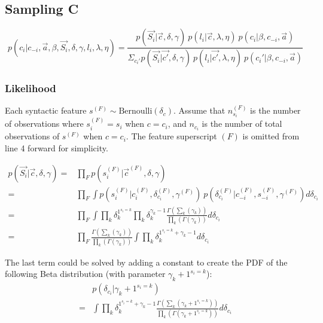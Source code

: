 \subsection{Sampling C}
\begin{equation}
p(c_{i}| c_{-i}, \vec{a}, \beta, \vec{S_{i}}, \delta, \gamma, l_{i}, \lambda, \eta) = \frac{p(\vec{S_{i}}| \vec{c}, \delta, \gamma)\ p(l_{i} |\vec{c},\lambda, \eta)\ p(c_{i}|\beta, c_{-i}, \vec{a})}{\Sigma_{c_{i}'}p(\vec{S_{i}}| \vec{c'}, \delta, \gamma)\ p(l_{i} |\vec{c'},\lambda, \eta)\ p(c_{i}'|\beta, c_{-i}, \vec{a})}
\end{equation}

\subsubsection{Likelihood}
Each syntactic feature $s^{(F)}\sim \mbox{Bernoulli}(\delta_{c})$. Assume that $n^{(F)}_{s_{i}}$ is the number of observations where $s^{(F)}_{i}=s_{i}$ when $c=c_{i}$, and $n_{c_{i}}$ is the number of total observations of $s^{(F)}$ when $c=c_{i}$. The feature superscript $(F)$ is omitted from line 4 forward for simplicity.

\begin{equation}
\begin{split}\label{p(s|c)}
p(\vec{S_{i}}| \vec{c}, \delta, \gamma) = & \prod_{F} p(s^{(F)}_{i}|\vec{c}^{(F)}, \delta, \gamma)\\%
= &\prod_{F}\int p(s^{(F)}_{i}|c_{i}^{(F)}, \delta^{(F)}_{c_{i}}, \gamma^{(F)})\ p(\delta^{(F)}_{c_{i}}|c^{(F)}_{-i}, s^{(F)}_{-i},\gamma^{(F)}) d\delta_{c_{i}}\\%
=& \prod_{F}\int \prod_{k} \delta^{1^{s_{i}=k}}_{k}%
\prod_{k} \delta_{k}^{\gamma_{k}-1}  %
\frac{\Gamma(\sum_{k}(\gamma_{k}))}{\prod_{k}(\Gamma(\gamma_{k}))}%
d\delta_{c_{i}} \\ 
=& \prod_{F} \frac{\Gamma(\sum_{k}(\gamma_{k}))}{\prod_{k}(\Gamma(\gamma_{k}))}%
\int \prod_{k}\delta_{k}^{1^{s_{i}=k}+\gamma_{k}-1}d\delta_{c_{i}} %
\end{split}
\end{equation}

\noindent The last term could be solved by adding a constant to create the PDF of the following Beta distribution (with parameter $\gamma_{k}+1^{s_{i}=k} $):
\begin{equation}
\begin{split}
&p(\delta_{c_{i}}|\gamma_{k}+1^{s_{i}=k})\\
=&\int \prod_{k}\delta_{k}^{1^{s_{i}=k}+\gamma_{k}-1}%
\frac{\Gamma(\sum_{k}(\gamma_{k}+1^{s_{i}=k}))}{\prod_{k}(\Gamma(\gamma_{k}+1^{s_{i}=k}))}%
d\delta_{c_{i}}
\end{split}
\end{equation}


